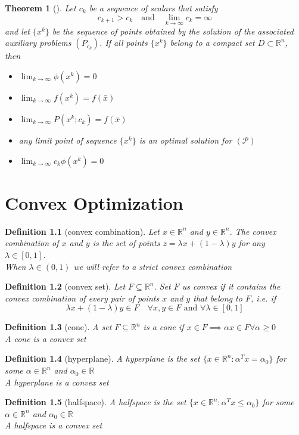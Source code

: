 \documentclass{book}
\newcommand{\R}{\mathbb{R}}
\theoremstyle{theoremv2}
\newtheorem{theorem}{Theorem}[chapter]
\theoremstyle{defv2}
\newtheorem{definition}{Definition}[chapter]
\theoremstyle{remark}
\theoremstyle{remark}
\begin{document}
\begin{theorem}[]
    Let $c_k$ be a sequence of scalars that satisfy 
    \[
        c_{k+1}>c_k \quad \text{and}\quad \lim_{k\to\infty}c_k = \infty
    \]
    and let $\{x^k\}$ be the sequence of points obtained by the solution of the associated auxiliary problems $(P_{c_k})$. If all points $\{x^k\}$ belong to a compact set $D\subset\R^n$, then
    \begin{itemize}
        \item $\lim_{k\to\infty} \phi(x^k)=0$
        \item $\lim_{k\to\infty} f(x^k)=f(\bar{x})$
        \item $\lim_{k\to\infty} P(x^k;c_k)=f(\bar{x})$
        \item any limit point of sequence $\{x^k\}$ is an optimal solution for $(\mathcal{P})$
        \item $\lim_{k\to\infty} c_k\phi(x^k)=0$
    \end{itemize}
\end{theorem}

\chapter{Convex Optimization}
\begin{definition}[convex combination]
    Let $x\in\R^n$ and $y\in\R^n$. The \emph{convex combination} of $x$ and $y$ is the set of points $z=\lambda x + (1-\lambda)y$ for any $\lambda\in[0,1]$.\\
    When $\lambda\in(0,1)$ we will refer to a \emph{strict} convex combination
\end{definition}
\begin{definition}[convex set]
    Let $F\subseteq \R^n$. Set $F$ us convex if it contains the convex combination of every pair of points $x$ and $y$ that belong to $F$, i.e. if 
    \[
        \lambda x+(1-\lambda)y\in F \quad \forall x,y \in F \text{ and } \forall \lambda\in[0,1]
    \]
\end{definition}
\begin{definition}[cone]
    A set $F\subseteq \R^n$ is a cone if $x\in F \implies \alpha x\in F\forall \alpha \geq 0$\\
    A cone is a convex set
\end{definition}
\begin{definition}[hyperplane]
    A hyperplane is the set $\{ x\in\R^n:\alpha^T x = \alpha_0 \}$ for some $\alpha\in\R^n$ and $\alpha_0\in\R$\\
    A hyperplane is a convex set
\end{definition}
\begin{definition}[halfspace]
    A halfspace is the set $\{ x\in\R^n:\alpha^Tx\leq\alpha_0 \}$ for some $\alpha\in\R^n$ and $\alpha_0\in\R$\\
    A halfspace is a convex set
\end{definition}
\end{document}
